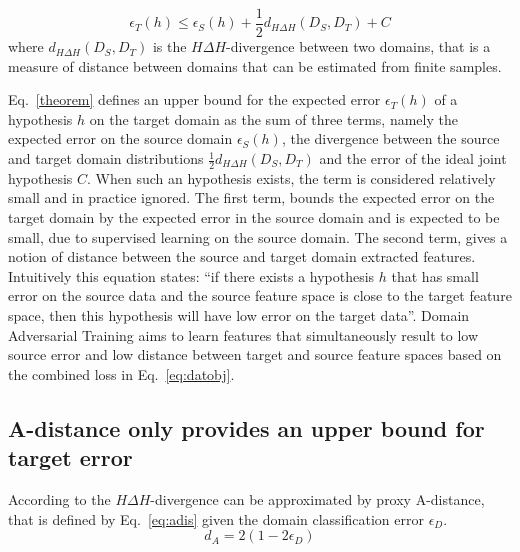 \documentclass[11pt]{article}
\begin{document}
\begin{equation}
\label{theorem}
    \epsilon_T(h) \leq \epsilon_S(h) + \frac{1}{2} d_{H \Delta H}(D_S, D_T) + C
\end{equation}
where \(d_{H \Delta H}(D_S, D_T)\)  is the \(H \Delta H\)-divergence \citep{kifer2004detecting} between two domains, that is a measure of distance between domains that can be estimated from finite samples.

Eq.~\ref{theorem} defines an upper bound for the expected error \(\epsilon_T(h)\) of a hypothesis \(h\) on the target domain as the sum of three terms, namely the expected error on the source domain \(\epsilon_S(h)\), the divergence between the source and target domain distributions \(\frac{1}{2} d_{H \Delta H}(D_S, D_T)\) and the error of the ideal joint hypothesis \(C\). When such an hypothesis exists, the term is considered relatively small and in practice ignored.
The first term, bounds the expected error on the target domain by the expected error in the source domain and is expected to be small, due to supervised learning on the source domain. The second term, gives a notion of distance between the source and target domain extracted features. 
Intuitively this equation states: ``if there exists a hypothesis \(h\) that has small error on the source data and the source feature space is close to the target feature space, then this hypothesis will have low error on the target data''. Domain Adversarial Training aims to learn features that simultaneously result to low source error and low distance between target and source feature spaces based on the combined loss in Eq.~\ref{eq:datobj}.

\subsection{A-distance only provides an upper bound for target error}

According to \citet{ben2007analysis} the \(H \Delta H\)-divergence can be approximated by proxy A-distance, that is defined by Eq.~\ref{eq:adis} given the domain classification error \(\epsilon_{D}\). 
\begin{equation}
    \label{eq:adis}
    d_{A} = 2(1-2\epsilon_{D})
\end{equation}
\end{document}
